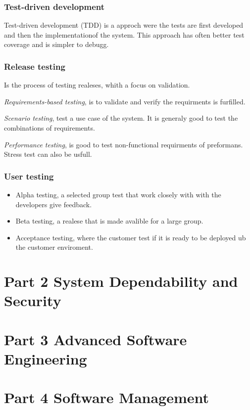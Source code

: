 \subsubsection{Test-driven development}
Test-driven development (TDD) is a approch were the tests are first developed and then the implementationof the system. This approach has often better test coverage and is simpler to debugg.

\subsubsection{Release testing}
Is the process of testing realeses, whith a focus on validation.

\textit{Requirements-based testing}, is to validate and verify the requirments is furfilled.

\textit{Scenario testing}, test a use case of the system. It is generaly good to test the combinations
of requirements.

\textit{Performance testing}, is good to test non-functional requirments of preformans. Stress test can also be usfull.


\subsubsection{User testing}
\begin{itemize}
\item Alpha testing, a selected group test that work closely with with the developers give feedback. 
\item Beta testing, a realese that is made avalible for a large group.
\item Acceptance testing, where the customer test if it is ready to be deployed ub the customer enviroment.
\end{itemize}




\section{Part 2 System Dependability and Security}

\section{Part 3 Advanced Software Engineering}
\section{Part 4 Software Management}
